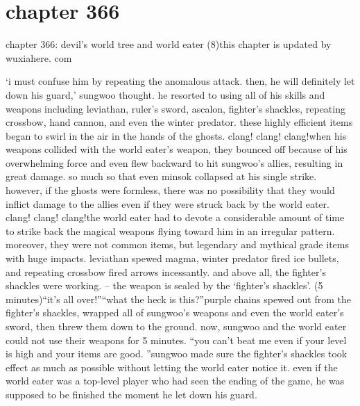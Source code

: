 \section{chapter 366}

chapter 366: devil’s world tree and world eater (8)this chapter is updated by wuxiahere.
com




‘i must confuse him by repeating the anomalous attack.
 then, he will definitely let down his guard,’ sungwoo thought.
he resorted to using all of his skills and weapons including leviathan, ruler’s sword, ascalon, fighter’s shackles, repeating crossbow, hand cannon, and even the winter predator.
 these highly efficient items began to swirl in the air in the hands of the ghosts.
clang! clang! clang!when his weapons collided with the world eater’s weapon, they bounced off because of his overwhelming force and even flew backward to hit sungwoo’s allies, resulting in great damage.
 so much so that even minsok collapsed at his single strike.
however, if the ghosts were formless, there was no possibility that they would inflict damage to the allies even if they were struck back by the world eater.
clang! clang! clang!the world eater had to devote a considerable amount of time to strike back the magical weapons flying toward him in an irregular pattern.
 moreover, they were not common items, but legendary and mythical grade items with huge impacts.
leviathan spewed magma, winter predator fired ice bullets, and repeating crossbow fired arrows incessantly.
and above all, the fighter’s shackles were working.
– the weapon is sealed by the ‘fighter’s shackles’.
 (5 minutes)“it’s all over!”“what the heck is this?”purple chains spewed out from the fighter’s shackles, wrapped all of sungwoo’s weapons and even the world eater’s sword, then threw them down to the ground.
now, sungwoo and the world eater could not use their weapons for 5 minutes.
“you can’t beat me even if your level is high and your items are good.
”sungwoo made sure the fighter’s shackles took effect as much as possible without letting the world eater notice it.
 even if the world eater was a top-level player who had seen the ending of the game, he was supposed to be finished the moment he let down his guard.

